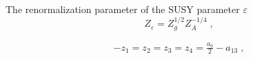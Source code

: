 \begin{appendix}
\noindent The renormalization parameter of the SUSY parameter $\varepsilon$
\begin{equation}
Z_{\varepsilon}=Z^{1/2}_{g}Z^{-1/4}_{A}\;,
\end{equation}

\begin{eqnarray}
-z_{1} = z_{2} =  z_{3} =  z_{4} = \frac{a_{0}}{2} - a_{13}\;, \nonumber
\end{eqnarray}
















\end{appendix}



